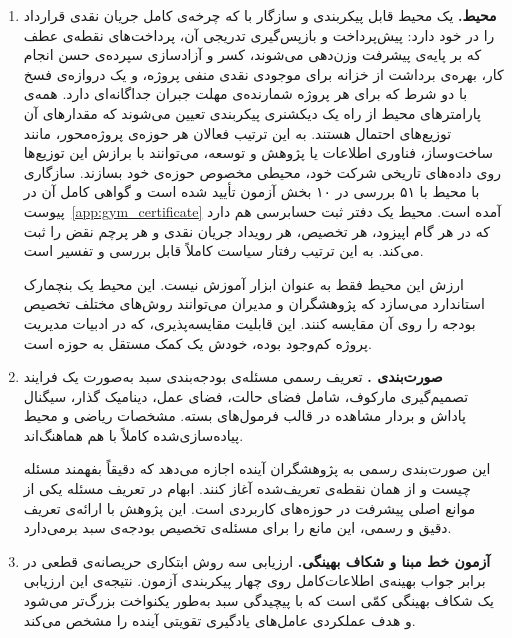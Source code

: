 \begin{enumerate}[leftmargin=*, label=\textbf{د\arabic*.}]

    \item \textbf{محیط.}
    یک محیط  قابل پیکربندی و سازگار با  که
    چرخه‌ی کامل جریان نقدی قرارداد  را در خود دارد:
    پیش‌پرداخت و بازپس‌گیری تدریجی آن، پرداخت‌های نقطه‌ی عطف که
    بر پایه‌ی پیشرفت وزن‌دهی می‌شوند، کسر و آزادسازی سپرده‌ی حسن
    انجام کار، بهره‌ی برداشت از خزانه برای موجودی نقدی منفی پروژه،
    و یک دروازه‌ی فسخ با دو شرط که برای هر پروژه شمارنده‌ی مهلت
    جبران جداگانه‌ای دارد.
    همه‌ی پارامترهای محیط از راه یک دیکشنری پیکربندی تعیین
    می‌شوند که مقدارهای آن توزیع‌های احتمال هستند.
    به این ترتیب فعالان هر حوزه‌ی پروژه‌محور، مانند ساخت‌وساز،
    فناوری اطلاعات یا پژوهش و توسعه، می‌توانند با برازش این توزیع‌ها
    روی داده‌های تاریخی شرکت خود، محیطی مخصوص حوزه‌ی خود بسازند.
    سازگاری با  محیط  با ۵۱ بررسی در ۱۰ بخش
    آزمون تأیید شده است و گواهی کامل آن در
    پیوست~\ref{app:gym_certificate} آمده است.
    محیط یک دفتر ثبت حسابرسی  هم دارد که در هر گام
    اپیزود، هر تخصیص، هر رویداد جریان نقدی و هر پرچم نقض را ثبت
    می‌کند. به این ترتیب رفتار سیاست کاملاً قابل بررسی و تفسیر
    است.

    ارزش این محیط فقط به عنوان ابزار آموزش نیست. این محیط یک
    بنچمارک استاندارد می‌سازد که پژوهشگران و مدیران می‌توانند
    روش‌های مختلف تخصیص بودجه را روی آن مقایسه کنند. این
    قابلیت مقایسه‌پذیری، که در ادبیات مدیریت پروژه کم‌وجود بوده،
    خودش یک کمک مستقل به حوزه است.

    \item \textbf{صورت‌بندی .}
    تعریف رسمی مسئله‌ی بودجه‌بندی سبد به‌صورت یک فرایند تصمیم‌گیری
    مارکوف، شامل فضای حالت، فضای عمل، دینامیک گذار، سیگنال پاداش و
    بردار مشاهده در قالب فرمول‌های بسته.
    مشخصات ریاضی و محیط پیاده‌سازی‌شده کاملاً با هم هماهنگ‌اند.

    این صورت‌بندی رسمی به پژوهشگران آینده اجازه می‌دهد که دقیقاً
    بفهمند مسئله چیست و از همان نقطه‌ی تعریف‌شده آغاز کنند. ابهام
    در تعریف مسئله یکی از موانع اصلی پیشرفت در حوزه‌های کاربردی
    است. این پژوهش با ارائه‌ی تعریف دقیق و رسمی، این مانع را
    برای مسئله‌ی تخصیص بودجه‌ی سبد برمی‌دارد.

    \item \textbf{آزمون خط مبنا و شکاف بهینگی.}
    ارزیابی سه روش ابتکاری حریصانه‌ی قطعی در برابر جواب بهینه‌ی
    اطلاعات‌کامل روی چهار پیکربندی آزمون.
    نتیجه‌ی این ارزیابی یک شکاف بهینگی کمّی است که با پیچیدگی سبد
    به‌طور یکنواخت بزرگ‌تر می‌شود و هدف عملکردی عامل‌های یادگیری
    تقویتی آینده را مشخص می‌کند.

\end{enumerate}

